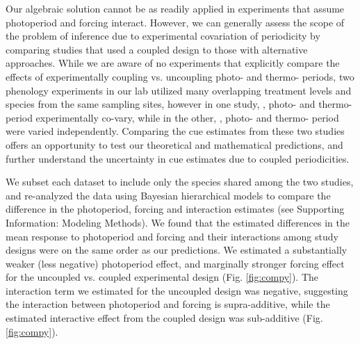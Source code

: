 \documentclass[11pt]{article}
\begin{document}
Our algebraic solution cannot be as readily applied in experiments that assume photoperiod and forcing interact. However, we can generally assess the scope of the problem of inference due to experimental covariation of periodicity by comparing studies that used a coupled design to those with alternative approaches. While we are aware of no experiments that explicitly compare the effects of experimentally coupling vs. uncoupling photo- and thermo- periods, two phenology experiments in our lab utilized many overlapping treatment levels and species from the same sampling sites, however in one study, \citet{Flynn2018}, photo- and thermo- period experimentally co-vary, while in the other, \citet{Buonaiuto:2021ug},  photo- and thermo- period were varied independently. Comparing the cue estimates from these two studies offers an opportunity to test our theoretical and mathematical predictions, and further understand the uncertainty in cue estimates due to coupled periodicities.

We subset each dataset to include only the species shared among the two studies, and re-analyzed the data using Bayesian hierarchical models to compare the difference in the photoperiod, forcing and interaction estimates (see Supporting Information: Modeling Methods). We found that the estimated differences in the mean response to photoperiod and forcing and their interactions among study designs were on the same order as our predictions. We estimated a substantially weaker (less negative) photoperiod effect, and marginally stronger forcing effect for the uncoupled vs. coupled experimental design (Fig. \ref{fig:compy}). The interaction term we estimated for the uncoupled design was negative, suggesting the interaction between photoperiod and forcing is supra-additive, while the estimated interactive effect from the coupled design was sub-additive (Fig. \ref{fig:compy}).
\end{document}
